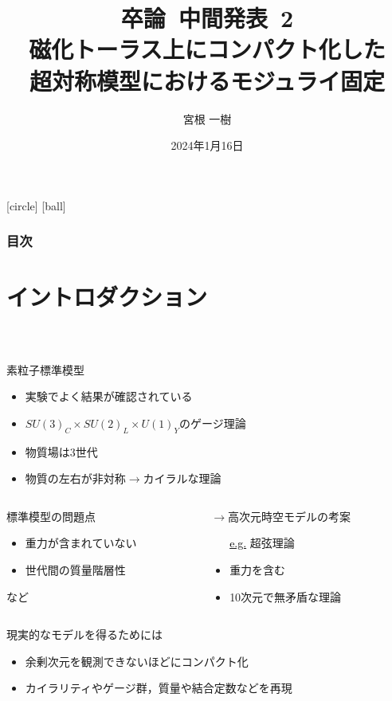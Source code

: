 \documentclass[
  a4paper,uplatex,dvipdfmx,9pt,
  xcolor = {dvipsnames,svgnames},
  hyperref ={colorlinks=true,citecolor=Navy,linkcolor=NavyBlue,urlcolor=purple}
]{beamer}
\title{
  卒論\ 中間発表\ 2
  \\
  {\LARGE
    磁化トーラス上にコンパクト化した
    \\
    超対称模型におけるモジュライ固定
  }
}
\author{宮根 一樹}
\date{2024年1月16日}
\begin{document}
\begin{frame}
  \titlepage
\end{frame}

[circle]
[ball]
\begin{frame}[allowframebreaks]
  \frametitle{目次}
  \tableofcontents
\end{frame}


\section{イントロダクション}

\begin{frame}
  \frametitle{\thesection\ \secname}

  素粒子標準模型
  \begin{itemize}
    \item 
    実験でよく結果が確認されている
    \item 
    $SU(3)_{C}\times SU(2)_{L}\times U(1)_{Y}$のゲージ理論
    \item 
    物質場は3世代
    \item 
    物質の左右が非対称$\rightarrow$カイラルな理論
  \end{itemize}

  \vspace{10pt}

  \begin{columns}[t]    
    \begin{column}{0.4\textwidth} 
      標準模型の問題点
      \begin{itemize}
        \item 
        重力が含まれていない
        \item 
        世代間の質量階層性
      \end{itemize}
      など    
    \end{column}
    \begin{column}{0.4\textwidth}  
      $\longrightarrow$高次元時空モデルの考案
    
      \begin{itemize}
        \item[\uline{\textcolor{black}{e.g.}}]    
        超弦理論    
        \item 
        重力を含む
        \item 
        10次元で無矛盾な理論
      \end{itemize}
    \end{column}
  \end{columns}

  \vspace{10pt}

  現実的なモデルを得るためには
  \begin{itemize}
    \item 
    余剰次元を観測できないほどにコンパクト化
    \item 
    カイラリティやゲージ群，質量や結合定数などを再現
  \end{itemize}

\end{frame}
\end{document}
